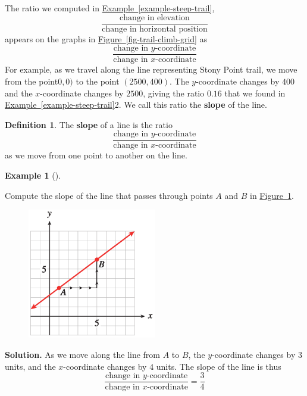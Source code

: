 \documentclass[10pt,]{book}
\newcommand{\terminology}[1]{\textbf{#1}}
\theoremstyle{plain}
\theoremstyle{definition}
\newtheorem{definition}[theorem]{Definition}
\theoremstyle{definition}
\newtheorem{example}[theorem]{Example}
\numberwithin{equation}{section}
\begin{document}
    The ratio we computed in \hyperref[example-steep-trail]{Example~\ref{example-steep-trail}},
    \begin{equation*}\frac{\text{change in elevation}}{\text{change in horizontal position}}\end{equation*}  
    appears on the graphs in \hyperref[fig-trail-climb-grid]{Figure~\ref{fig-trail-climb-grid}} as
    \begin{equation*}\frac{\text{change in }y\text{-coordinate}}{\text{change in }x\text{-coordinate}}\end{equation*} 
    For example, as we travel along the line representing Stony Point trail, we move from the point\(0, 0)\) to the point \((2500, 400)\). The \(y\)-coordinate changes by \(400\) and the \(x\)-coordinate changes by \(2500\), giving the ratio \(0.16\) that we found in \hyperref[example-steep-trail]{Example~\ref{example-steep-trail}}2. We call this ratio the \terminology{slope} of the line.
%
\begin{definition}\label{definition-slope}
The \terminology{slope} of a line is the ratio
    \begin{equation*}\frac{\text{change in }y\text{-coordinate}}{\text{change in }x\text{-coordinate}}\end{equation*} 
    as we move from one point to another on the line.
\end{definition}
\begin{example}[]\label{example-slope-grid}

    Compute the slope of the line that passes through points \(A\) and \(B\) in \hyperref[fig-slope-grid]{Figure~\ref{fig-slope-grid}}.
%
\leavevmode%
\begin{figure}
\centering
\includegraphics[width=0.50\textwidth,]{images/fig-slope-grid.svg}\caption{\label{fig-slope-grid}}
\end{figure}
\par\medskip\noindent%
\textbf{Solution.}\quad 
    As we move along the line from \(A\) to \(B\), the \(y\)-coordinate changes by \(3\) units, and the \(x\)-coordinate changes by \(4\) units. The slope of the line is thus
    \begin{equation*}\frac{\text{change in }y\text{-coordinate}}{\text{change in }x\text{-coordinate}}=\frac{3}{4}\end{equation*}\end{example}
\end{document}
